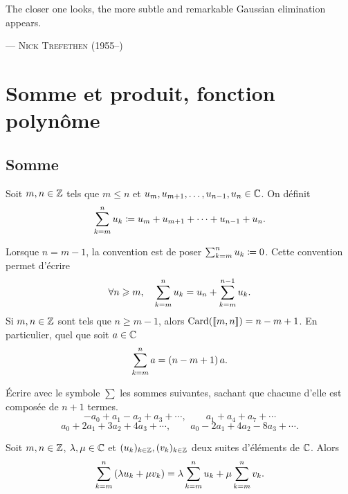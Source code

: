 \documentclass{magnolia}
\begin{document}
\setlength{}
\epigraph{\og The closer one looks, the more subtle and remarkable Gaussian elimination appears.\fg}{--- \textsc{Nick Trefethen (1955--)}}
\magtoc



\bigskip

\section{Somme et produit, fonction polynôme}

\subsection{Somme}

\begin{definition}[utile=-3]
Soit $m,n\in\mathbb{Z}$ tels que $m \leq n$ et $u_{m},u_{m+1},\ldots,u_{n-1},u_n\in\mathbb{C}$. On
définit
\[\sum_{k=m}^n u_k\coloneqq u_{m}+u_{m+1}+\cdots+u_{n-1}+u_n.\]
\end{definition}

\begin{remarqueUnique}
\remarque Lorsque $n=m-1$, la convention est de poser $\sum_{k=m}^n u_k\coloneqq 0$. Cette
  convention permet d'écrire
  \[\forall n\geqslant m,\quad \sum_{k=m}^n u_k = u_n + \sum_{k=m}^{n-1} u_k.\]
\remarque Si $m,n\in\mathbb{Z}$ sont tels que $n\geq m-1$, alors $\operatorname{Card}(\left\llbracket m,n\right\rrbracket)=n-m+1$. En
  particulier, quel que soit $a\in\mathbb{C}$
  \[\sum_{k=m}^{n} a =\left(n-m+1\right)a.\]
\end{remarqueUnique}


\begin{exoUnique}
\exo Écrire avec le symbole $\sum$ les sommes suivantes, sachant que chacune d'elle est composée de $n+1$ termes.
  \[-a_0+a_1-a_2 +a_3+\cdots, \qquad a_1+a_4+a_7+\cdots\]
  \[a_0+2a_1+3a_2+4a_3+\cdots, \qquad a_0-2a_1+4a_2-8a_3+\cdots.\]
\end{exoUnique}

\begin{proposition}
Soit $m,n\in\mathbb{Z}$, $\lambda,\mu\in\mathbb{C}$ et $(u_k)_{k\in\mathbb{Z}}, (v_k)_{k\in\mathbb{Z}}$ deux suites d'éléments de $\mathbb{C}$. Alors
\[\sum_{k=m}^n \left(\lambda u_k+\mu v_k\right)=\lambda\sum_{k=m}^n u_k + \mu\sum_{k=m}^n v_k.\]
\end{proposition}
\end{document}
